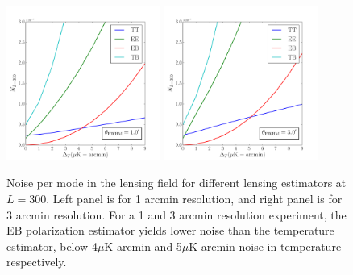 \begin{figure}[htbp]
\centering
\includegraphics[width=0.45\textwidth]{CMBLensing/ell300_1_00.pdf}
\includegraphics[width=0.45\textwidth]{CMBLensing/ell300_3_00.pdf}
\caption{Noise per mode in the lensing field for different lensing estimators at $L = 300$.  Left panel is for 1 arcmin resolution, and right panel is for 3 arcmin resolution.  For a 1 and 3 arcmin resolution experiment, the EB polarization estimator yields lower noise than the temperature estimator, below 4$\mu$K-arcmin and 5$\mu$K-arcmin noise in temperature respectively.}
\label{crossoverPlot}
\end{figure}

